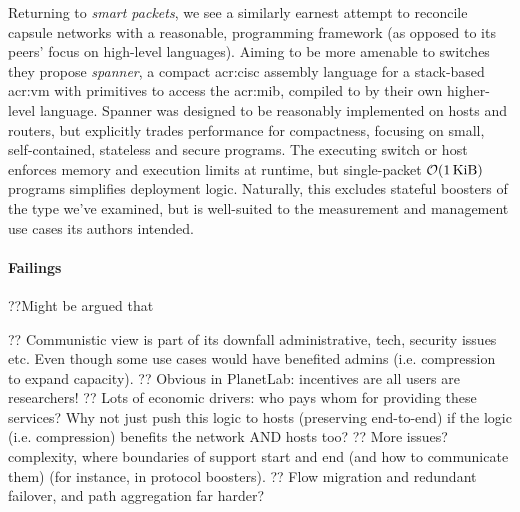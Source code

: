 Returning to \emph{smart packets}, we see a similarly earnest attempt to reconcile capsule networks with a reasonable, programming framework (as opposed to its peers' focus on high-level languages).
Aiming to be more amenable to switches they propose \emph{spanner}, a compact \gls{acr:cisc} assembly language for a stack-based \gls{acr:vm} with primitives to access the \gls{acr:mib}, compiled to by their own higher-level language.
Spanner was designed to be reasonably implemented on hosts and routers, but explicitly trades performance for compactness, focusing on small, self-contained, stateless and secure programs.
The executing switch or host enforces memory and execution limits at runtime, but single-packet $\mathcal{O}(\text{\qty{1}{\kibi\byte}})$ programs simplifies deployment logic.
Naturally, this excludes stateful boosters of the type we've examined, but is well-suited to the measurement and management use cases its authors intended.


\paragraph{Failings}
??Might be argued that

?? Communistic view is part of its downfall administrative, tech, security issues etc. Even though some use cases would have benefited admins (i.e. compression to expand capacity).
?? Obvious in PlanetLab: incentives are all users are researchers!
?? Lots of economic drivers: who pays whom for providing these services? Why not just push this logic to hosts (preserving end-to-end) if the logic (i.e. compression) benefits the network AND hosts too?
?? More issues? complexity, where boundaries of support start and end (and how to communicate them) (for instance, in protocol boosters).
?? Flow migration and redundant failover, and path aggregation far harder?

